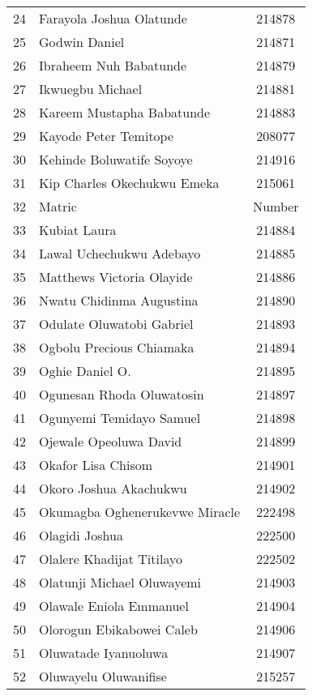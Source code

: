 \documentclass[a4paper]{article}
\begin{document}
\begin{center}
\begin{longtable} { c|l|c }
            24 & Farayola Joshua Olatunde & 214878\\
            25 & Godwin Daniel & 214871\\
            26 & Ibraheem Nuh Babatunde & 214879\\
            27 & Ikwuegbu Michael & 214881\\
            28 & Kareem Mustapha Babatunde & 214883\\
            29 & Kayode Peter Temitope & 208077\\
            30 & Kehinde Boluwatife Soyoye & 214916\\
            31 & Kip Charles Okechukwu Emeka & 215061\\
            32 & Matric  & Number\\
            33 & Kubiat Laura & 214884\\
            34 & Lawal Uchechukwu Adebayo & 214885\\
            35 & Matthews Victoria Olayide & 214886\\
            36 & Nwatu Chidinma Augustina & 214890\\
            37 & Odulate Oluwatobi Gabriel & 214893\\
            38 & Ogbolu Precious Chiamaka & 214894\\
            39 & Oghie Daniel O. & 214895\\
            40 & Ogunesan Rhoda Oluwatosin & 214897\\
            41 & Ogunyemi Temidayo Samuel & 214898\\
            42 & Ojewale Opeoluwa David & 214899\\
            43 & Okafor Lisa Chisom & 214901\\
            44 & Okoro Joshua Akachukwu & 214902\\
            45 & Okumagba Oghenerukevwe Miracle & 222498\\
            46 & Olagidi Joshua & 222500\\
            47 & Olalere Khadijat Titilayo & 222502\\
            48 & Olatunji Michael Oluwayemi & 214903\\
            49 & Olawale Eniola Emmanuel & 214904\\
            50 & Olorogun Ebikabowei Caleb & 214906\\
            51 & Oluwatade Iyanuoluwa & 214907\\
            52 & Oluwayelu Oluwanifise & 215257\\

\end{longtable}
\end{center}
\end{document}
